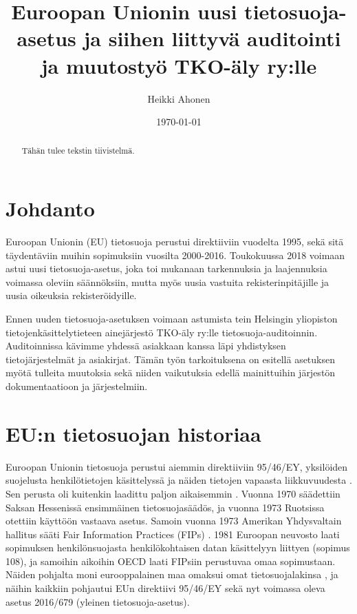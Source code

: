 \documentclass[finnish]{tktltiki}
\begin{document}
\singlespacing

\title{Euroopan Unionin uusi tietosuoja-asetus ja siihen liittyvä auditointi ja muutostyö TKO-äly ry:lle}
\author{Heikki Ahonen}
\date{\today}

\maketitle





\begin{abstract}

Tähän tulee tekstin tiivistelmä.

\end{abstract}

\mytableofcontents

\section{Johdanto}

Euroopan Unionin (EU) tietosuoja perustui direktiiviin vuodelta 1995, sekä sitä täydentäviin muihin sopimuksiin vuosilta 2000-2016. Toukokuussa 2018 voimaan astui uusi tietosuoja-asetus, joka toi mukanaan tarkennuksia ja laajennuksia voimassa oleviin säännöksiin, mutta myös uusia vastuita rekisterinpitäjille ja uusia oikeuksia rekisteröidyille. 

Ennen uuden tietosuoja-asetuksen voimaan astumista tein Helsingin yliopiston tietojenkäsittelytieteen ainejärjestö TKO-äly ry:lle tietosuoja-auditoinnin. Auditoinnissa kävimme yhdessä asiakkaan kanssa läpi yhdistyksen tietojärjestelmät ja asiakirjat. Tämän työn tarkoituksena on esitellä asetuksen myötä tulleita muutoksia sekä niiden vaikutuksia edellä mainittuihin järjestön dokumentaatioon ja järjestelmiin.

\section{EU:n tietosuojan historiaa}

Euroopan Unionin tietosuoja perustui aiemmin direktiiviin 95/46/EY, yksilöiden suojelusta henkilötietojen käsittelyssä ja näiden tietojen vapaasta liikkuvuudesta \cite{eu95}. Sen perusta oli kuitenkin laadittu paljon aikaisemmin \cite{tikkinen}. Vuonna 1970 säädettiin Saksan Hessenissä ensimmäinen tietosuojasäädös, ja vuonna 1973 Ruotsissa otettiin käyttöön vastaava asetus. Samoin vuonna 1973 Amerikan Yhdysvaltain hallitus sääti Fair Information Practices (FIPs) \cite{tikkinen}. 1981 Euroopan neuvosto laati sopimuksen henkilönsuojasta henkilökohtaisen datan käsittelyyn liittyen (sopimus 108), ja samoihin aikoihin OECD laati FIPsiin perustuvaa omaa sopimustaan. Näiden pohjalta moni eurooppalainen maa omaksui omat tietosuojalakinsa \cite{tikkinen}, ja näihin kaikkiin pohjautui EUn direktiivi 95/46/EY sekä nyt voimassa oleva asetus 2016/679 (yleinen tietosuoja-asetus). 
\end{document}
